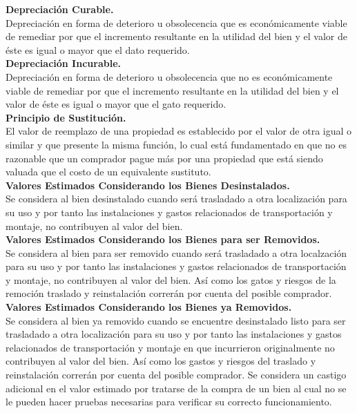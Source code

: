 \textbf{Depreciación Curable.} \\ 
Depreciación en forma de deterioro u obsolecencia que es económicamente viable de remediar por que el incremento resultante en la utilidad del bien y el valor de éste es igual o mayor que el dato requerido. \\[6mm] 
\textbf{Depreciación Incurable.} \\ 
Depreciación en forma de deterioro u obsolecencia que no es económicamente viable de remediar por que el incremento resultante en la utilidad del bien y el valor de éste es igual o mayor que el gato requerido. \\[6mm] 
\textbf{Principio de Sustitución.} \\ 
El valor de reemplazo de una propiedad es establecido por el valor de otra igual o similar y que presente la misma función, lo cual está fundamentado en que no es razonable que un comprador pague más por una propiedad que está siendo valuada que el costo de un equivalente sustituto. \\[6mm] 
\textbf{Valores Estimados Considerando los Bienes Desinstalados.} \\ 
Se considera al bien desinstalado cuando será trasladado a otra localización para su uso y por tanto las instalaciones y gastos relacionados de transportación y montaje, no contribuyen al valor del bien. \\[6mm] 
\textbf{Valores Estimados Considerando los Bienes para ser Removidos.} \\ 
Se considera al bien para ser removido cuando será trasladado a otra localzación para su uso y por tanto las instalaciones y gastos relacionados de transportación y montaje, no contribuyen al valor del bien.
Así como los gatos y riesgos de la remoción traslado y reinstalación correrán por cuenta del posible comprador. \\[6mm] 
\textbf{Valores Estimados Considerando los Bienes ya Removidos.} \\ 
Se considera al bien ya removido cuando se encuentre desinstalado listo para ser trasladado a otra localización para su uso y por tanto las instalaciones y gastos relacionados de transportación y montaje en que incurrieron originalmente no contribuyen al valor del bien.
Así como los gastos y riesgos del traslado y reinstalación correrán por cuenta del posible comprador.
Se considera un castigo adicional en el valor estimado por tratarse de la compra de un bien al cual no se le pueden hacer pruebas necesarias para verificar su correcto funcionamiento.

